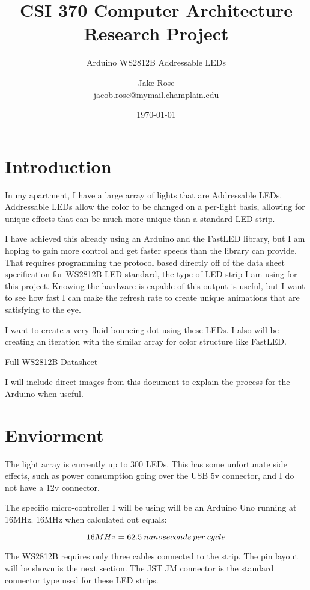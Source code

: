 \documentclass{scrartcl}
\date{\today}
\author{Jake Rose \\ jacob.rose@mymail.champlain.edu}
\title{CSI 370 Computer Architecture \\ Research Project}
\subtitle{Arduino WS2812B Addressable LEDs}
\begin{document}
\maketitle

\section{Introduction}
In my apartment, I have a large array of lights that are Addressable LEDs. Addressable LEDs allow the color to be changed on a per-light basis, allowing for unique effects that can be much more unique than a standard LED strip.


I have achieved this already using an Arduino and the FastLED library, but I am hoping to gain more control and get faster speeds than the library can provide. That requires programming the protocol based directly off of the data sheet specification for WS2812B LED standard, the type of LED strip I am using for this project. Knowing the hardware is capable of this output is useful, but I want to see how fast I can make the refresh rate to create unique animations that are satisfying to the eye.

I want to create a very fluid bouncing dot using these LEDs. 
I also will be creating an iteration with the similar array for color structure like FastLED.\linebreak

\centerline{\href{https://cdn-shop.adafruit.com/datasheets/WS2812B.pdf}{Full WS2812B Datasheet}}

I will include direct images from this document to explain the process for the Arduino when useful. \pagebreak


\section{Enviorment}
The light array is currently up to 300 LEDs. This has some unfortunate side effects, such as power consumption going over the USB 5v connector, and I do not have a 12v connector.

The specific micro-controller I will be using will be an Arduino Uno running at 16MHz. 16MHz when calculated out equals: 

\begin{equation}
    \centering
    16MHz = 62.5\: nanoseconds\: per\: cycle
    \label{eq:ns_per_cycle}
\end{equation}

The WS2812B requires only three cables connected to the strip. The pin layout will be shown is the next section. The JST JM connector is the standard connector type used for these LED strips.
\end{document}
